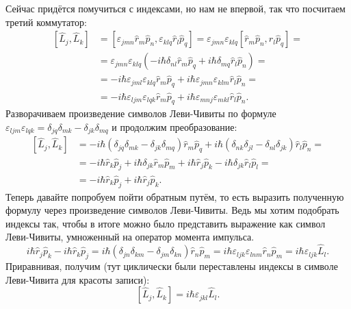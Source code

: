 Сейчас придётся помучиться с индексами, но нам не впервой, так что посчитаем
третий коммутатор:
\begin{align*}
  \left[\hat{L}_j, \hat{L}_k\right] &= [\varepsilon_{jmn} \hat{r}_m \hat{p}_n, \varepsilon_{klq} \hat{r}_l\hat{p}_q] = \varepsilon_{jmn}\varepsilon_{klq}[\hat{r}_m \hat{p}_n, \hat{r}_l\hat{p}_q] =\\
  &= \varepsilon_{jmn}\varepsilon_{klq}(-i\hbar\delta_{nl}\hat{r}_m\hat{p}_q + i\hbar\delta_{mq}\hat{r}_l\hat{p}_n) =\\
  &= -i\hbar \varepsilon_{jml}\varepsilon_{klq}\hat{r}_m\hat{p}_q + i\hbar\varepsilon_{jmn}\varepsilon_{klm}\hat{r}_l\hat{p}_n =\\
  &= -i\hbar\varepsilon_{ljm}\varepsilon_{lqk}\hat{r}_m\hat{p}_q + i\hbar\varepsilon_{mnj}\varepsilon_{mkl}\hat{r}_l\hat{p}_n.
\end{align*}
Разворачиваем произведение символов Леви-Чивиты по формуле
$\varepsilon_{ljm}\varepsilon_{lqk} = \delta_{jq}\delta_{mk} -
  \delta_{jk}\delta_{mq}$ и продолжим преобразование:
\begin{align*}
  \left[\hat{L}_j, \hat{L}_k\right] &=
  -i\hbar(\delta_{jq}\delta_{mk} - \delta_{jk}\delta_{mq})\hat{r}_m\hat{p}_q + i\hbar(\delta_{nk}\delta_{jl} - \delta_{nl}\delta_{jk})\hat{r}_l\hat{p}_n =\\
  &= -i\hbar\hat{r}_k\hat{p}_j + i\hbar\delta_{jk}\hat{r}_m\hat{p}_m + i\hbar\hat{r}_j\hat{p}_k - i\hbar\delta_{jk}\hat{r}_l\hat{p}_l =\\
  &= -i\hbar\hat{r}_k\hat{p}_j + i\hbar\hat{r}_j\hat{p}_k.
\end{align*}
Теперь давайте попробуем пойти обратным путём, то есть выразить полученную
формулу через произведение символов Леви-Чивиты. Ведь мы хотим подобрать
индексы так, чтобы в итоге можно было представить выражение как символ
Леви-Чивиты, умноженный на оператор момента импульса.
\[
  i\hbar\hat{r}_j\hat{p}_k - i\hbar\hat{r}_k\hat{p}_j = i\hbar(\delta_{jn}\delta_{km} - \delta_{jm}\delta_{kn})\hat{r}_n\hat{p}_m = i\hbar\varepsilon_{ljk}\varepsilon_{lnm}\hat{r}_n\hat{p}_m = i\hbar\varepsilon_{ljk}\hat{L}_l.
\]
Приравнивая, получим (тут циклически были переставлены индексы в символе
Леви-Чивита для красоты записи):
\[
  \left[\hat{L}_j, \hat{L}_k\right] = i\hbar\varepsilon_{jkl}\hat{L}_l.
\]

